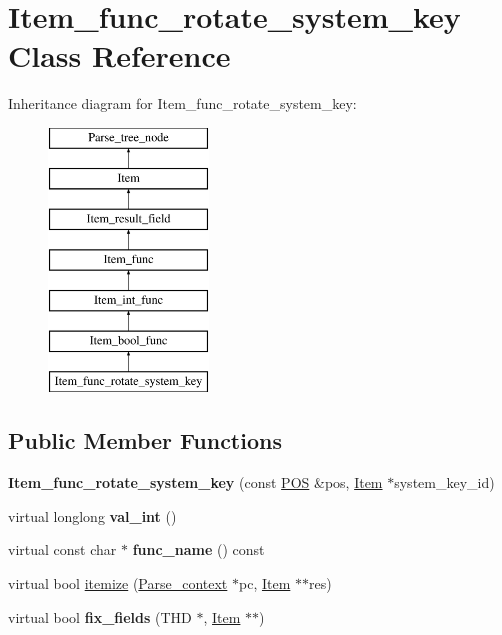 \hypertarget{classItem__func__rotate__system__key}{}\section{Item\+\_\+func\+\_\+rotate\+\_\+system\+\_\+key Class Reference}
\label{classItem__func__rotate__system__key}
Inheritance diagram for Item\+\_\+func\+\_\+rotate\+\_\+system\+\_\+key\+:\begin{figure}[H]
\begin{center}
\leavevmode
\includegraphics[height=7.000000cm]{classItem__func__rotate__system__key}
\end{center}
\end{figure}
\subsection*{Public Member Functions}
\begin{DoxyCompactItemize}
\item 
\mbox{\label{classItem__func__rotate__system__key_a9c40b551c2d39ff2c05bdbfcf5fa03ee}} 
{\bfseries Item\+\_\+func\+\_\+rotate\+\_\+system\+\_\+key} (const \mbox{\hyperlink{structYYLTYPE}{P\+OS}} \&pos, \mbox{\hyperlink{classItem}{Item}} $\ast$system\+\_\+key\+\_\+id)
\item 
\mbox{\label{classItem__func__rotate__system__key_a5642f8568cdd697ad66f1d60ae341696}} 
virtual longlong {\bfseries val\+\_\+int} ()
\item 
\mbox{\label{classItem__func__rotate__system__key_ac0a2aecaf19eecc13278380e3f443937}} 
virtual const char $\ast$ {\bfseries func\+\_\+name} () const
\item 
virtual bool \mbox{\hyperlink{classItem__func__rotate__system__key_a9fb9f671f7e7e6cc30d52cf84be06237}{itemize}} (\mbox{\hyperlink{structParse__context}{Parse\+\_\+context}} $\ast$pc, \mbox{\hyperlink{classItem}{Item}} $\ast$$\ast$res)
\item 
\mbox{\label{classItem__func__rotate__system__key_ad94226304baefe11c8be1a1c2c9c6b8f}} 
virtual bool {\bfseries fix\+\_\+fields} (T\+HD $\ast$, \mbox{\hyperlink{classItem}{Item}} $\ast$$\ast$)
\end{DoxyCompactItemize}

